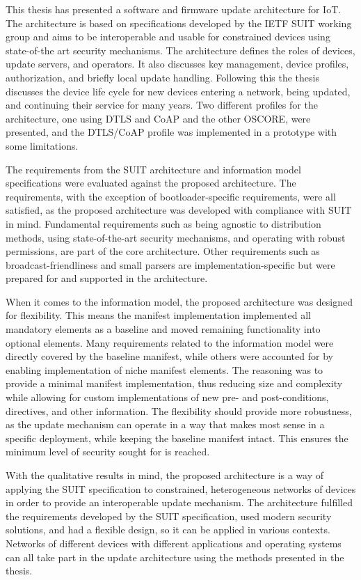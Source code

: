 \documentclass[0-thesis.tex]{subfiles}
\begin{document}
This thesis has presented a software and firmware update architecture for IoT. The
architecture is based on specifications developed by the IETF SUIT working group and aims
to be interoperable and usable for constrained devices using state-of-the art security
mechanisms. The architecture defines the roles of devices, update servers, and operators.
It also discusses key management, device profiles, authorization, and briefly local update
handling. Following this the thesis discusses the device life cycle for new devices
entering a network, being updated, and continuing their service for many years. Two
different profiles for the architecture, one using DTLS and CoAP and the other OSCORE,
were presented, and the DTLS/CoAP profile was implemented in a prototype with some
limitations.

The requirements from the SUIT architecture and information model specifications were
evaluated against the proposed architecture. The requirements, with the exception of
bootloader-specific requirements, were all satisfied, as the proposed architecture was
developed with compliance with SUIT in mind. Fundamental requirements such as being
agnostic to distribution methods, using state-of-the-art security mechanisms, and
operating with robust permissions, are part of the core architecture. Other requirements
such as broadcast-friendliness and small parsers are implementation-specific but were
prepared for and supported in the architecture.

When it comes to the information model, the proposed architecture was designed for
flexibility. This means the manifest implementation implemented all mandatory elements as
a baseline and moved remaining functionality into optional elements. Many requirements
related to the information model were directly covered by the baseline manifest, while
others were accounted for by enabling implementation of niche manifest elements. The
reasoning was to provide a minimal manifest implementation, thus reducing size and
complexity while allowing for custom implementations of new pre- and post-conditions,
directives, and other information. The flexibility should provide more robustness, as the
update mechanism can operate in a way that makes most sense in a specific deployment,
while keeping the baseline manifest intact. This ensures the minimum level of security
sought for is reached. 

With the qualitative results in mind, the proposed architecture is a way of applying the
SUIT specification to constrained, heterogeneous networks of devices in order to provide
an interoperable update mechanism. The architecture fulfilled the requirements developed
by the SUIT specification, used modern security solutions, and had a flexible design, so
it can be applied in various contexts. Networks of different devices with different
applications and operating systems can all take part in the update architecture using the
methods presented in the thesis.
\end{document}
